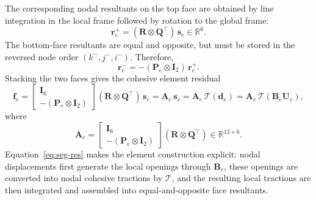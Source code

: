 \documentclass[smallextended]{svjour3}       %
\newcommand{\vb}[1]{\bm{#1}}      %
\newcommand{\mat}[1]{\mathbf{#1}}  %
\newcommand{\QQ}{\mat{Q}}          %
\providecommand{\bd}{\vb d}
\renewcommand{\bd}{\vb d}
\begin{document}
The corresponding nodal resultants on the top face are obtained by line
integration in the local frame followed by rotation to the global frame:
\begin{equation}
	\vb r_e^{+}
	=
	(\mat R\otimes \QQ^\top)\,\vb s_e
	\in\mathbb R^6.
	\label{eq:seg-rplus}
\end{equation}
The bottom-face resultants are equal and opposite, but must be stored in the
reversed node order \((k^-,j^-,i^-)\). Therefore,
\begin{equation}
	\vb r_e^{-}
	=
	-(\mat P_e\otimes \mat I_2)\,\vb r_e^{+}.
	\label{eq:seg-rminus}
\end{equation}
Stacking the two faces gives the cohesive element residual
\begin{equation}
	\vb f_e
	=
	\begin{bmatrix}
		\mat I_6\\
		-(\mat P_e\otimes \mat I_2)
	\end{bmatrix}
	(\mat R\otimes \QQ^\top)\,\vb s_e
	=
	\mat A_e\,\vb s_e
	=
	\mat A_e\,\mathcal T(\bd_e)
	=
	\mat A_e\,\mathcal T(\mat B_e\vb U_e),
	\label{eq:seg-res}
\end{equation}
where
\begin{equation}
	\mat A_e
	=
	\begin{bmatrix}
		\mat I_6\\
		-(\mat P_e\otimes \mat I_2)
	\end{bmatrix}
	(\mat R\otimes \QQ^\top)
	\in\mathbb R^{12\times 6}.
	\label{eq:seg-Ae}
\end{equation}
Equation~\eqref{eq:seg-res} makes the element construction explicit:
nodal displacements first generate the local openings through
\(\mat B_e\), these openings are converted into nodal cohesive tractions by
\(\mathcal T\), and the resulting local tractions are then integrated and
assembled into equal-and-opposite face resultants.
\end{document}
